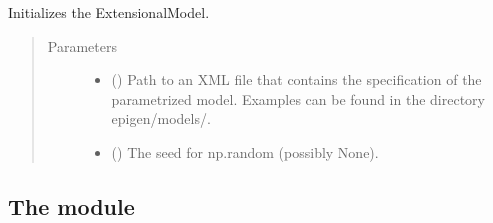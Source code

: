 \documentclass[a4paper,10pt,english]{sphinxhowto}
\begin{document}
\begin{fulllineitems}
\begin{fulllineitems}
\begin{quote}
\begin{description}
\end{description}\end{quote}

\end{fulllineitems}


\begin{fulllineitems}
\label{\detokenize{utils:utils.parametrized_model.ParametrizedModel.__init__}}
Initializes the ExtensionalModel.
\begin{quote}\begin{description}
\item[{Parameters}] \leavevmode\begin{itemize}
\item {} 
 () \textendash{} Path to an XML file that contains the specification of the parametrized model.
Examples can be found in the directory epigen/models/.

\item {} 
 () \textendash{} The seed for np.random (possibly None).

\end{itemize}

\end{description}\end{quote}

\end{fulllineitems}


\end{fulllineitems}



\subsection{The module }
\label{\detokenize{utils:module-utils.argparse_checks}}\label{\detokenize{utils:the-module-utils-argparse-checks-py}}
\end{document}

